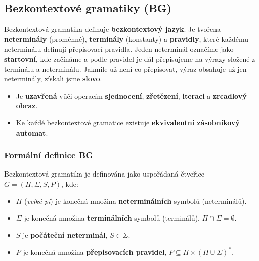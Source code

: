 \subsection{Bezkontextové gramatiky (BG)}
Bezkontextová gramatika definuje \textbf{bezkontextový jazyk}. Je tvořena \textbf{neterminály} (proměnné), \textbf{terminály} (konstanty) a \textbf{pravidly}, které každému neterminálu definují přepisovací pravidla. Jeden neterminál označíme jako \textbf{startovní}, kde začínáme a podle pravidel je dál přepisujeme na výrazy složené z terminálu a neterminálu. Jakmile už není co přepisovat, výraz obsahuje už jen neterminály, získali jsme \textbf{slovo}.

\begin{itemize}
\item Je \textbf{uzavřená} vůči operacím \textbf{sjednocení}, \textbf{zřetězení}, \textbf{iteraci} a \textbf{zrcadlový obraz}.
\item Ke každé bezkontextové gramatice existuje \textbf{ekvivalentní zásobníkový automat}.
\end{itemize}

\subsubsection{Formální definice BG}
Bezkontextová gramatika je definována jako uspořádaná čtveřice $G = (\Pi, \Sigma, S, P)$, kde:
\begin{itemize}
	\item $\Pi$ (\textit{velké pí}) je konečná množina \textbf{neterminálních} symbolů (neterminálů).
	\item $\Sigma$ je konečná množina \textbf{terminálních} symbolů (terminálů), $\Pi \cap \Sigma = \emptyset$.
	\item $S$ je \textbf{počáteční neterminál}, $S \in \Sigma$.
	\item $P$ je konečná množina \textbf{přepisovacích pravidel}, $P \subseteq \Pi \times (\Pi \cup \Sigma)^*$.
\end{itemize}


